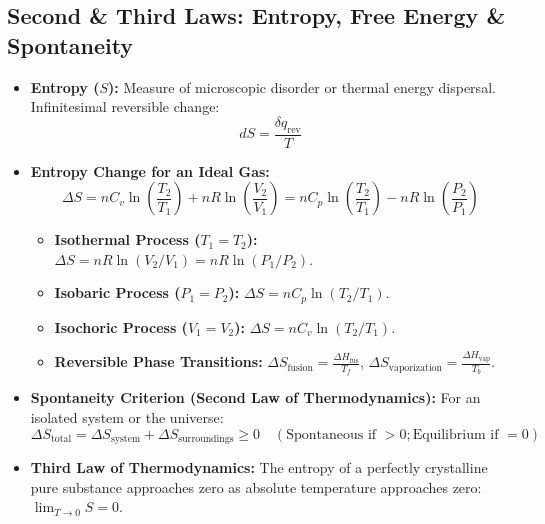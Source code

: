 \documentclass[10pt,a4paper]{article}
\begin{document}
\subsection{Second \& Third Laws: Entropy, Free Energy \& Spontaneity}
\begin{itemize}
  \item \textbf{Entropy ($S$):} Measure of microscopic disorder or thermal energy dispersal. Infinitesimal reversible change:
  \begin{equation}
    dS = \frac{\delta q_{\text{rev}}}{T}
  \end{equation}
  \item \textbf{Entropy Change for an Ideal Gas:}
  \begin{equation}
    \Delta S = n C_v \ln\left(\frac{T_2}{T_1}\right) + n R \ln\left(\frac{V_2}{V_1}\right) = n C_p \ln\left(\frac{T_2}{T_1}\right) - n R \ln\left(\frac{P_2}{P_1}\right)
  \end{equation}
  \begin{itemize}
    \item \textbf{Isothermal Process ($T_1 = T_2$):} $\Delta S = n R \ln(V_2 / V_1) = n R \ln(P_1 / P_2)$.
    \item \textbf{Isobaric Process ($P_1 = P_2$):} $\Delta S = n C_p \ln(T_2 / T_1)$.
    \item \textbf{Isochoric Process ($V_1 = V_2$):} $\Delta S = n C_v \ln(T_2 / T_1)$.
    \item \textbf{Reversible Phase Transitions:} $\Delta S_{\text{fusion}} = \frac{\Delta H_{\text{fus}}}{T_f}$, $\Delta S_{\text{vaporization}} = \frac{\Delta H_{\text{vap}}}{T_b}$.
  \end{itemize}
  \item \textbf{Spontaneity Criterion (Second Law of Thermodynamics):} For an isolated system or the universe:
  \begin{equation}
    \Delta S_{\text{total}} = \Delta S_{\text{system}} + \Delta S_{\text{surroundings}} \ge 0 \quad (\text{Spontaneous if } > 0; \text{Equilibrium if } = 0)
  \end{equation}
  \item \textbf{Third Law of Thermodynamics:} The entropy of a perfectly crystalline pure substance approaches zero as absolute temperature approaches zero: $\lim_{T \to 0} S = 0$.
\end{itemize}
\end{document}
